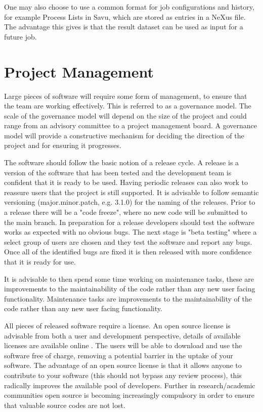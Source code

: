 \documentclass[jnr]{iosart2x}
\begin{document}
One may also choose to use a common format for job configurations and history, for example Process Lists in Savu, which are stored as entries in a NeXus file.
The advantage this gives is that the result dataset can be used as input for a future job.

\section{Project Management}
\label{Project Management}

Large pieces of software will require some form of management, to ensure that the team are working effectively.
This is referred to as a governance model.
The scale of the governance model will depend on the size of the project and could range from an advisory committee to a project management board.
A governance model will provide a constructive mechanism for deciding the direction of the project and for ensuring it progresses.

The software should follow the basic notion of a release cycle.
A release is a version of the software that has been tested and the development team is confident that it is ready to be used.
Having periodic releases can also work to reassure users that the project is still supported.
It is advisable to follow semantic versioning \cite{Semantic_Versioning} (major.minor.patch, e.g. 3.1.0) for the naming of the releases.
Prior to a release there will be a "code freeze", where no new code will be submitted to the main branch.
In preparation for a release developers should test the software works as expected with no obvious bugs.
The next stage is "beta testing" where a select group of users are chosen and they test the software and report any bugs.
Once all of the identified bugs are fixed it is then released with more confidence that it is ready for use.

It is advisable to then spend some time working on maintenance tasks, these are improvements to the maintainability of the code rather than any new user facing functionality.
Maintenance tasks are improvements to the maintainability of the code rather than any new user facing functionality.

All pieces of released software require a license.
An open source license is advisable from both a user and development perspective, details of available licenses are available online \cite{OSI_Licenses}.
The users will be able to download and use the software free of charge, removing a potential barrier in the uptake of your software.
The advantage of an open source license is that it allows anyone to contribute to your software (this should not bypass any review process), this radically improves the available pool of developers.
Further in research/academic communities open source is becoming increasingly compulsory in order to ensure that valuable source codes are not lost.
\end{document}
